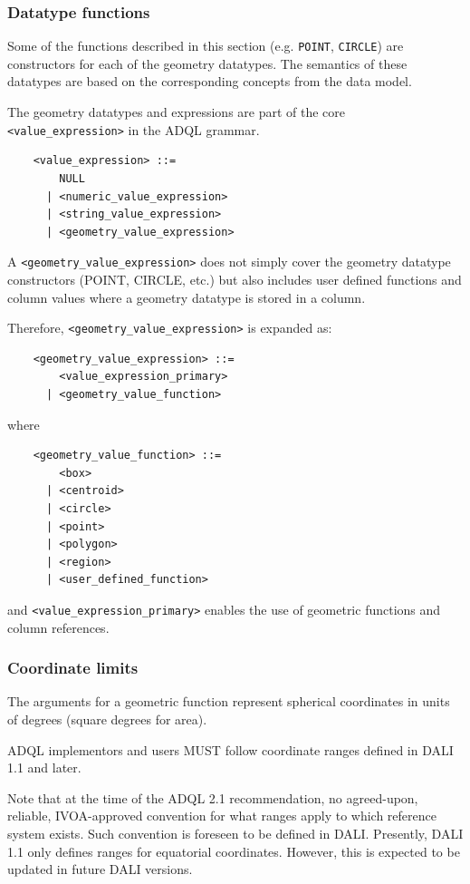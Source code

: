 \documentclass[11pt,a4paper]{ivoa}
\begin{document}
\subsubsection{Datatype functions}
\label{sec:functions.geom.type}

Some of the functions described in this section (e.g. \verb:POINT:,
\verb:CIRCLE:) are constructors for each of the geometry datatypes. The
semantics of these datatypes are based on the corresponding concepts from the
\STCSpec{} data model.

The geometry datatypes and expressions are part of the core
\verb:<value_expression>: in the ADQL grammar.

\begin{verbatim}
    <value_expression> ::=
        NULL
      | <numeric_value_expression>
      | <string_value_expression>
      | <geometry_value_expression>
\end{verbatim}

A \verb:<geometry_value_expression>: does not simply cover the geometry datatype
constructors (POINT, CIRCLE, etc.) but also includes user defined functions and
column values where a geometry datatype is stored in a column.

Therefore, \verb:<geometry_value_expression>: is expanded as:
\begin{verbatim}
    <geometry_value_expression> ::=
        <value_expression_primary>
      | <geometry_value_function>
\end{verbatim}
\noindent
where
\begin{verbatim}
    <geometry_value_function> ::=
        <box>
      | <centroid>
      | <circle>
      | <point>
      | <polygon>
      | <region>
      | <user_defined_function>
\end{verbatim}
and \verb:<value_expression_primary>: enables the use of geometric functions
and column references.

\subsubsection{Coordinate limits}
\label{sec:functions.geom.limits}

The arguments for a geometric function represent spherical coordinates
in units of degrees (square degrees for area).

ADQL implementors and users MUST follow coordinate ranges defined in DALI 1.1
and later.

Note that at the time of the ADQL 2.1 recommendation, no agreed-upon, reliable,
IVOA-approved convention for what ranges apply to which reference system exists.
Such convention is foreseen to be defined in DALI. Presently, DALI 1.1 only
defines ranges for equatorial coordinates. However, this is expected to be
updated in future DALI versions.
\end{document}
